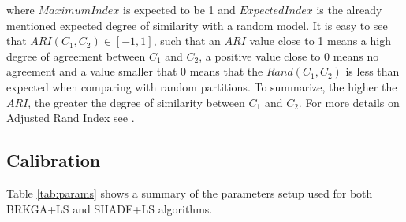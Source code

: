 \documentclass[review]{elsarticle}
\begin{document}
where $MaximumIndex$ is expected to be 1 and $ExpectedIndex$ is the already mentioned expected degree of similarity with a random model. It is easy to see that $ARI(C_1, C_2) \in [-1,1]$, such that an $ARI$ value close to 1 means a high degree of agreement between $C_1$ and $C_2$, a positive value close to 0 means no agreement and a value smaller that 0 means that the $Rand(C_1, C_2)$ is less than expected when comparing with random partitions. To summarize, the higher the $ARI$, the greater the degree of similarity between $C_1$ and $C_2$. For more details on Adjusted Rand Index see \cite{hubert1985comparing}.


\subsection{Calibration}

Table \ref{tab:params} shows a summary of the parameters setup used for both BRKGA+LS and SHADE+LS algorithms.

\begin{table}[!h]
	\centering
	\setlength{\tabcolsep}{7pt}
	\renewcommand{\arraystretch}{1.4}
		
		\caption{Parameters setup used for BRKGA and SHADE.}
		\label{tab:params}
	\end{table}
	
\end{document}
